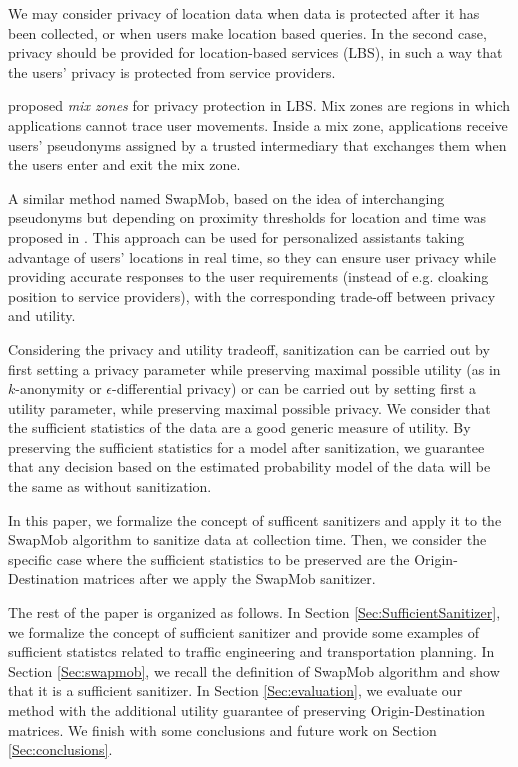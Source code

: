 \documentclass[times,twocolumn,final,authoryear]{elsarticle}
\begin{document}
{\color{blue}
We may consider privacy of location data when data is protected after it has been collected, or when users make location based queries. In the second case, privacy should be provided for location-based services (LBS), in such a way that the users' privacy is protected from service providers. 

\cite{Beresford2003} proposed \emph{mix zones} for privacy protection in LBS.
Mix zones are regions in which applications cannot trace user movements. 
Inside a mix zone, applications receive users' pseudonyms assigned by a trusted intermediary that exchanges
them when the users enter and exit the mix zone. 


A similar method named SwapMob, based on the idea of interchanging pseudonyms but depending on proximity thresholds for location and time was proposed in
\cite{Salas:2018-c}.
This approach can be used for personalized assistants taking advantage of users' locations in real time, so they can ensure user privacy while providing accurate responses to the user requirements (instead of e.g. cloaking position to service providers), with the corresponding trade-off between privacy and utility.

Considering the privacy and utility tradeoff, sanitization can be carried out by first setting a privacy parameter while preserving maximal possible utility (as in $k$-anonymity or $\epsilon$-differential privacy) or can be carried out by setting first a utility parameter, while preserving maximal possible privacy.
We consider that the sufficient statistics of the data are a good generic measure of utility. 
By preserving the sufficient statistics for a model after sanitization, we guarantee that any decision based on the estimated probability model of the data will be the same as without sanitization.
}

In this paper, we formalize the concept of sufficent sanitizers and apply it to the SwapMob algorithm to sanitize data at collection time. 
Then, we consider the specific case where the sufficient statistics to be preserved are the Origin-Destination matrices after we apply the SwapMob sanitizer.

  
The rest of the paper is organized as follows. In Section \ref{Sec:SufficientSanitizer}, we formalize the concept of sufficient sanitizer and provide some examples of sufficient statistcs related to traffic engineering and transportation planning. 
In Section \ref{Sec:swapmob}, 
we recall the definition of SwapMob algorithm and show that it is a sufficient sanitizer.
In Section \ref{Sec:evaluation}, we evaluate our method  with the additional utility guarantee of preserving Origin-Destination matrices. 
We finish with some conclusions and future work on Section \ref{Sec:conclusions}.
\end{document}
